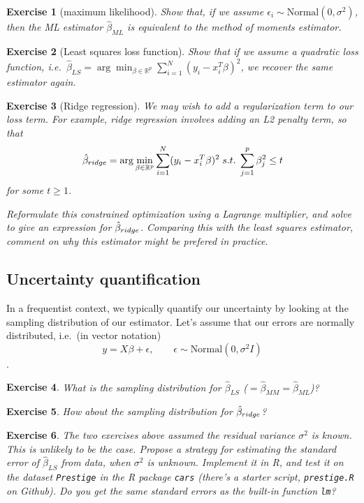 \documentclass[twoside]{article}
\newcounter{lecnum}
\newtheorem{exercise}{Exercise}[lecnum]
\begin{document}
\begin{exercise}[maximum likelihood]
  Show that, if we assume $\epsilon_i\sim \mbox{Normal}(0,\sigma^2)$, then the ML estimator $\hat{\beta}_{ML}$ is equivalent to the method of moments estimator.
\end{exercise}



\begin{exercise}[Least squares loss function]
  Show that if we assume a quadratic loss function, i.e.\ $\hat{\beta}_{LS} = \arg\min_{\beta\in \mathbb{R}^p}\sum_{i=1}^N(y_i - x_i^T\beta)^2$, we recover the same estimator again.
\end{exercise}

\begin{exercise}[Ridge regression]
  We may wish to add a regularization term to our loss term. For example, ridge regression involves adding an L2 penalty term, so that
  $$\hat{\beta}_{\small{ridge}} = \arg\min_{\beta\in \mathbb{R}^p}\sum_{i=1}^N(y_i - x_i^T\beta)^2 \; s.t. \; \sum_{j=1}^p \beta_j^2 \leq t$$
  for some $t\geq 1$.

  Reformulate this constrained optimization using a Lagrange multiplier, and solve to give an expression for $\hat{\beta}_{\small{ridge}}$. Comparing this with the least squares estimator, comment on why this estimator might be prefered in practice.
\end{exercise}

  
\subsection{Uncertainty quantification}

In a frequentist context, we typically quantify our uncertainty by looking at the sampling distribution of our estimator. Let's assume that our errors are normally distributed, i.e.\ (in vector notation)
$$y = X\beta+\epsilon,\qquad \epsilon \sim \mbox{Normal}(0,\sigma^2 I)$$.

\begin{exercise}
  What is the sampling distribution for $\hat{\beta}_{LS}$ ($=\hat{\beta}_{MM}=\hat{\beta}_{ML}$)?
\end{exercise}

\begin{exercise}
  How about the sampling distribution for $\hat{\beta}_{\small{ridge}}$?
\end{exercise}


\begin{exercise}
  The two exercises above assumed the residual variance $\sigma^2$ is known. This is unlikely to be the case. Propose a strategy for estimating the standard error of $\hat{\beta}_{LS}$ from data, when $\sigma^2$ is unknown. Implement it in R, and test it on the dataset \texttt{Prestige} in the R package \texttt{cars} (there's a starter script, \texttt{prestige.R} on Github). Do you get the same standard errors as the built-in function \texttt{lm}?
\end{exercise}
\end{document}
